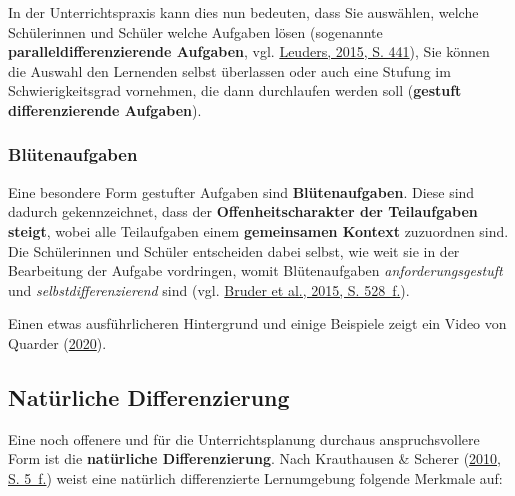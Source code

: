\documentclass[
]{scrbook}
\theoremstyle{definition}
\theoremstyle{definition}
\theoremstyle{definition}
\theoremstyle{definition}
\theoremstyle{remark}
\begin{document}
In der Unterrichtspraxis kann dies nun bedeuten, dass Sie auswählen, welche Schülerinnen und Schüler welche Aufgaben lösen (sogenannte \textbf{paralleldifferenzierende Aufgaben}, vgl. \protect\hyperlink{ref-Leuders2015}{Leuders, 2015, S. 441}), Sie können die Auswahl den Lernenden selbst überlassen oder auch eine Stufung im Schwierigkeitsgrad vornehmen, die dann durchlaufen werden soll (\textbf{gestuft differenzierende Aufgaben}).

\hypertarget{bluxfctenaufgaben}{%
\subsubsection{Blütenaufgaben}\label{bluxfctenaufgaben}}

Eine besondere Form gestufter Aufgaben sind \textbf{Blütenaufgaben}. Diese sind dadurch gekennzeichnet, dass der \textbf{Offenheitscharakter der Teilaufgaben steigt}, wobei alle Teilaufgaben einem \textbf{gemeinsamen Kontext} zuzuordnen sind. Die Schülerinnen und Schüler entscheiden dabei selbst, wie weit sie in der Bearbeitung der Aufgabe vordringen, womit Blütenaufgaben \emph{anforderungsgestuft} und \emph{selbstdifferenzierend} sind (vgl. \protect\hyperlink{ref-Bruder2015a}{Bruder et al., 2015, S. 528~f.}).

Einen etwas ausführlicheren Hintergrund und einige Beispiele zeigt ein Video von Quarder (\protect\hyperlink{ref-Quarder2020}{2020}).

\hypertarget{natuxfcrliche-differenzierung}{%
\subsection{Natürliche Differenzierung}\label{natuxfcrliche-differenzierung}}

Eine noch offenere und für die Unterrichtsplanung durchaus anspruchsvollere Form ist die \textbf{natürliche Differenzierung}. Nach Krauthausen \& Scherer (\protect\hyperlink{ref-Krauthausen2010}{2010, S. 5~f.}) weist eine natürlich differenzierte Lernumgebung folgende Merkmale auf:
\end{document}
